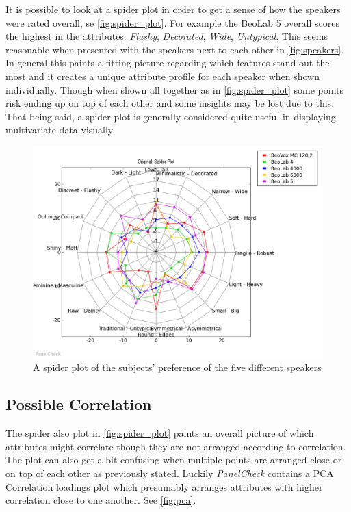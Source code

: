 It is possible to look at a spider plot in order to get a sense of how the speakers were rated overall, se \autoref{fig:spider_plot}. For example the BeoLab 5 overall scores the highest in the attributes: \textit{Flashy}, \textit{Decorated}, \textit{Wide}, \textit{Untypical}. This seems reasonable when presented with the speakers next to each other in \autoref{fig:speakers}. In general this paints a fitting picture regarding which features stand out the most and it creates a unique attribute profile for each speaker when shown individually. Though when shown all together as in \autoref{fig:spider_plot} some points risk ending up on top of each other and some insights may be lost due to this. That being said, a spider plot is generally considered quite useful in displaying multivariate data visually. 

\begin{figure}[H]
\centering
\includegraphics[width = \textwidth]{Figure/spider_plot.png}
\caption{A spider plot of the subjects' preference of the five different speakers}
\label{fig:spider_plot}
\end{figure}

\subsection*{Possible Correlation}
The spider also plot in \autoref{fig:spider_plot} paints an overall picture of which attributes might correlate though they are not arranged according to correlation. The plot can also get a bit confusing when multiple points are arranged close or on top of each other as previously stated. Luckily \textit{PanelCheck} contains a PCA Correlation loadings plot which presumably arranges attributes with higher correlation close to one another. See \autoref{fig:pca}.


